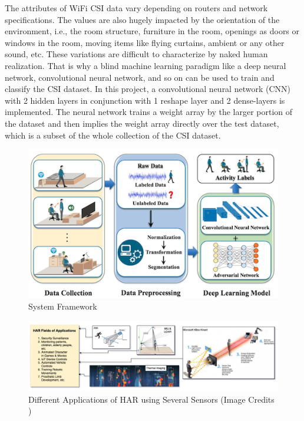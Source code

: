 \documentclass[conference]{IEEEtran}
\begin{document}
The attributes of WiFi CSI data vary depending on routers and network specifications. The values are also hugely impacted by the orientation of the environment, i.e., the room structure, furniture in the room, openings as doors or windows in the room, moving items like flying curtains, ambient or any other sound,  etc. These variations are difficult to characterize by naked human realization. That is why a blind machine learning paradigm like a deep neural network, convolutional neural network, and so on can be used to train and classify the CSI dataset. In this project, a convolutional neural network (CNN) with 2 hidden layers in conjunction with 1 reshape layer and 2 dense-layers is implemented. The neural network trains a weight array by the larger portion of the dataset and then implies the weight array directly over the test dataset, which is a subset of the whole collection of the CSI dataset.

\begin{figure}[htbp]
\centerline{\includegraphics{images/system_framework.png}}
\caption{System Framework}
\label{fig_sys_framework}
\end{figure}

\begin{figure}[htbp]
\centerline{\includegraphics[scale=0.45]{images/har_categories.png}}
\caption{Different Applications of HAR using Several Sensors (Image Credits \cite{img_har_categories} \cite{imu_lidar})}
\label{fig_har_categories}
\end{figure}
\end{document}
